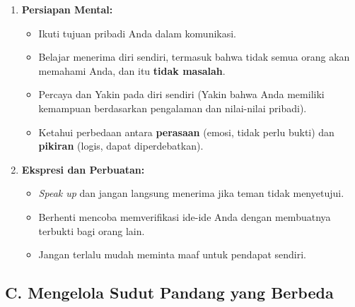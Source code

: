 \documentclass[
  letterpaper,
  DIV=11,
  numbers=noendperiod]{scrreprt}
\providecommand{\tightlist}{%
  \setlength{\itemsep}{0pt}\setlength{\parskip}{0pt}}
\begin{document}
\begin{enumerate}
\def\labelenumi{\arabic{enumi}.}
\tightlist
\item
  \textbf{Persiapan Mental:}

  \begin{itemize}
  \tightlist
  \item
    Ikuti tujuan pribadi Anda dalam komunikasi.
  \item
    Belajar menerima diri sendiri, termasuk bahwa tidak semua orang akan
    memahami Anda, dan itu \textbf{tidak masalah}.
  \item
    Percaya dan Yakin pada diri sendiri (Yakin bahwa Anda memiliki
    kemampuan berdasarkan pengalaman dan nilai-nilai pribadi).
  \item
    Ketahui perbedaan antara \textbf{perasaan} (emosi, tidak perlu
    bukti) dan \textbf{pikiran} (logis, dapat diperdebatkan).
  \end{itemize}
\item
  \textbf{Ekspresi dan Perbuatan:}

  \begin{itemize}
  \tightlist
  \item
    \emph{Speak up} dan jangan langsung menerima jika teman tidak
    menyetujui.
  \item
    Berhenti mencoba memverifikasi ide-ide Anda dengan membuatnya
    terbukti bagi orang lain.
  \item
    Jangan terlalu mudah meminta maaf untuk pendapat sendiri.
  \end{itemize}
\end{enumerate}

\subsection{C. Mengelola Sudut Pandang yang
Berbeda}\label{c.-mengelola-sudut-pandang-yang-berbeda}
\end{document}
